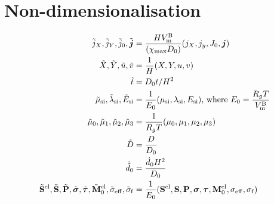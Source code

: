 \section{Non-dimensionalisation}\label{section:nonDim}
\begin{align}
    \tilde{j}_X, \tilde{j}_Y, \tilde{j}_0, \tilde{\bm{j}} &=  \frac{H V_{\rm{m}}^{\rm{B}}}{(\chi_{{\rm{max}}} D_0)} (j_X, j_y, J_0, \bm{j}) \\
    \tilde{X}, \tilde{Y}, \tilde{u}, \tilde{v} &= \frac{1}{H}(X, Y, u, v) \\
    \tilde{t} &= D_0 t/H^2 \\
     \tilde{\mu}_{\text{si}}, \tilde{\lambda}_{\text{si}}, \tilde{E}_{\text{si}} &= \frac{1}{E_0} (\mu_{\text{si}}, \lambda_{\text{si}}, E_{\text{si}}) 
     \text{, where }  E_0 = \frac{R_g T}{V_{\rm{m}}^{\rm{B}}} \\
     \tilde{\mu}_0, \tilde{\mu}_1, \tilde{\mu}_2, \tilde{\mu}_3 &= \frac{1}{R_g T}(\mu_0, \mu_1, \mu_2, \mu_3) \\
     \tilde{D} &= \frac{D}{D_0} \\
     \dot{\tilde{d}}_{0} &= \frac{{\dot{d}}_0 H^2}{D_0} \\
     \tilde{\mathbf{S}}^{{\rm{el}}}, \tilde{\mathbf{S}}, \tilde{\mathbf{P}}, \tilde{\bm{\sigma}}, \tilde{\bm{\tau}}, \tilde{\mathbf{M}}^{{\rm{el}}}_{0}, \tilde{\sigma}_{\rm{eff}}, \tilde{\sigma}_{\rm{f}} &= \frac{1}{E_0}(\mathbf{S}^{{\rm{el}}}, \mathbf{S}, \mathbf{P}, \bm{\sigma}, \bm{\tau}, \mathbf{M}^{{\rm{el}}}_{0}, \sigma_{\rm{eff}}, \sigma_{\rm{f}})
\end{align}

